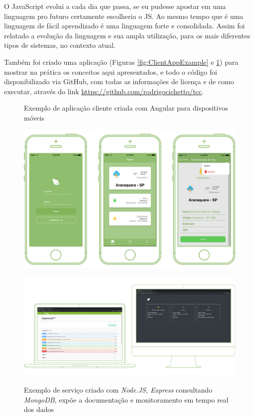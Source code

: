 \documentclass[
	12pt,				%
	openright,			%
	twoside,			%
	a4paper,			%
	english,			%
	brazil				%
	]{abntex2}
\begin{document}
O JavaScript evolui a cada dia que passa, se eu pudesse apostar em uma linguagem pro futuro certamente escolheria o JS. Ao mesmo tempo que é uma linguagem de fácil aprendizado é uma linguagem forte e consolidada. Assim foi relatado a evolução da linguagem e sua  ampla utilização, para os mais diferentes tipos de sistemas, no contexto atual.

Também foi criado uma aplicação (Figuras \ref{fig:ClientAppExample} e \ref{fig:ServerAppExample}) para mostrar na prática os conceitos aqui apresentados, e todo o código foi disponibilizado via GitHub, com todas as informações de licença e de como executar, através do link \href{https://github.com/rodrigocichetto/tcc}{https://github.com/rodrigocichetto/tcc}.

\begin{figure}[h]
	\centering

	\caption{Exemplo de aplicação cliente criada com Angular para dispositivos móveis} \label{fig:ClientAppExample}
    \includegraphics[scale=0.4]{client-app} \\

    \caption{Exemplo de serviço criado com \textit{Node.JS, Express} consultando \textit{MongoDB}, expõe a documentação e monitoramento em tempo real dos dados} \label{fig:ServerAppExample}
    \includegraphics[scale=0.45]{server-app} \\

\end{figure}
\end{document}
